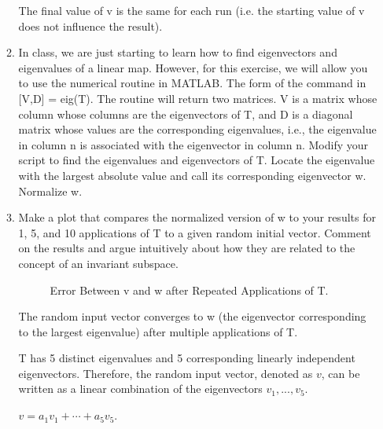 \documentclass[fleqn]{article}
\begin{document}
\begin{enumerate}[nolistsep]
\begin{enumerate}
					The final value of v is the same for each run (i.e. the starting value of v does not influence the result).
					
				\item In class, we are just starting to learn how to find eigenvectors and eigenvalues of a linear map. However, for this exercise, we will allow you to use the numerical routine in MATLAB. The form of the command in [V,D] = eig(T). The routine will return two matrices. V is a matrix whose column whose columns are the eigenvectors of T, and D is a diagonal matrix whose values are the corresponding eigenvalues, i.e., the eigenvalue in column n is associated with the eigenvector in column n. Modify your script to find the eigenvalues and eigenvectors of T. Locate the eigenvalue with the largest absolute value and call its corresponding eigenvector w. Normalize w.
				
				\item Make a plot that compares the normalized version of w to your results for 1, 5, and 10 applications of T to a given random initial vector. Comment on the results and argue intuitively about how they are related to the concept of an invariant subspace.
				
					\begin{figure}[H]				
							\centerline{}
							\caption{Error Between v and w after Repeated Applications of T.}
							\label{comparison_to_eigenvalue}
					\end{figure}
				
					The random input vector converges to w (the eigenvector corresponding to the largest eigenvalue) after multiple applications of T. 
					
					T has 5 distinct eigenvalues and 5 corresponding linearly independent eigenvectors. Therefore, the random input vector, denoted as $v$, can be written as a linear combination of the eigenvectors $v_1,...,v_5$.
					
					$v = a_1v_1 + \cdots + a_5v_5$.
					

\end{enumerate}
\end{enumerate}
\end{document}
